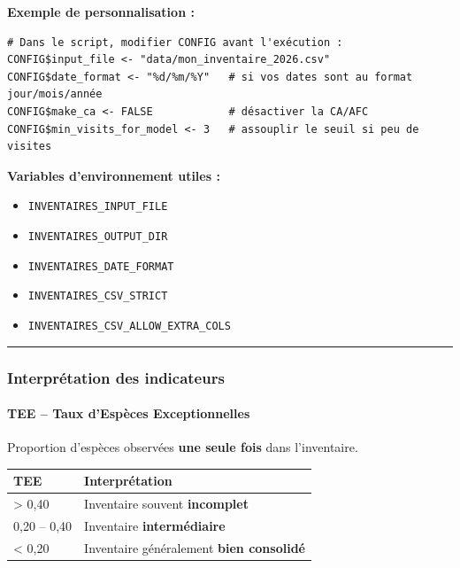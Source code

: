 \textbf{Exemple de personnalisation :}

\begin{verbatim}
# Dans le script, modifier CONFIG avant l'exécution :
CONFIG$input_file <- "data/mon_inventaire_2026.csv"
CONFIG$date_format <- "%d/%m/%Y"   # si vos dates sont au format jour/mois/année
CONFIG$make_ca <- FALSE            # désactiver la CA/AFC
CONFIG$min_visits_for_model <- 3   # assouplir le seuil si peu de visites
\end{verbatim}

\textbf{Variables d'environnement utiles :}

\begin{itemize}
\tightlist
\item
  \texttt{INVENTAIRES\_INPUT\_FILE}
\item
  \texttt{INVENTAIRES\_OUTPUT\_DIR}
\item
  \texttt{INVENTAIRES\_DATE\_FORMAT}
\item
  \texttt{INVENTAIRES\_CSV\_STRICT}
\item
  \texttt{INVENTAIRES\_CSV\_ALLOW\_EXTRA\_COLS}
\end{itemize}

\begin{center}\rule{0.5\linewidth}{0.5pt}\end{center}

\subsubsection{Interprétation des
indicateurs}\label{interpruxe9tation-des-indicateurs}

\paragraph{TEE -- Taux d'Espèces
Exceptionnelles}\label{tee-taux-despuxe8ces-exceptionnelles}

Proportion d'espèces observées \textbf{une seule fois} dans
l'inventaire.

{\def\LTcaptype{none} %
\begin{longtable}[]{@{}ll@{}}
\toprule\noalign{}
TEE & Interprétation \\
\midrule\noalign{}
\endhead
\bottomrule\noalign{}
\endlastfoot
\textgreater{} 0,40 & Inventaire souvent \textbf{incomplet} \\
0,20 -- 0,40 & Inventaire \textbf{intermédiaire} \\
\textless{} 0,20 & Inventaire généralement \textbf{bien consolidé} \\
\end{longtable}
}

